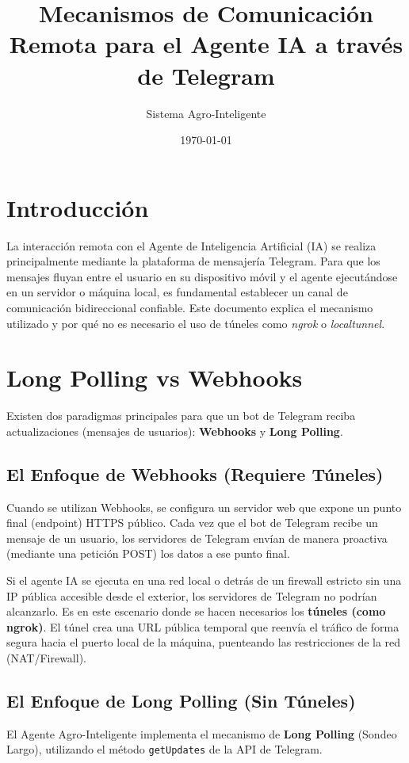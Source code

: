 \documentclass[12pt,a4paper]{article}
\title{Mecanismos de Comunicación Remota para el Agente IA a través de Telegram}
\author{Sistema Agro-Inteligente}
\date{\today}
\begin{document}
\maketitle

\section{Introducción}
La interacción remota con el Agente de Inteligencia Artificial (IA) se realiza principalmente mediante la plataforma de mensajería Telegram. Para que los mensajes fluyan entre el usuario en su dispositivo móvil y el agente ejecutándose en un servidor o máquina local, es fundamental establecer un canal de comunicación bidireccional confiable. Este documento explica el mecanismo utilizado y por qué no es necesario el uso de túneles como \textit{ngrok} o \textit{localtunnel}.

\section{Long Polling vs Webhooks}
Existen dos paradigmas principales para que un bot de Telegram reciba actualizaciones (mensajes de usuarios): \textbf{Webhooks} y \textbf{Long Polling}.

\subsection{El Enfoque de Webhooks (Requiere Túneles)}
Cuando se utilizan Webhooks, se configura un servidor web que expone un punto final (endpoint) HTTPS público. Cada vez que el bot de Telegram recibe un mensaje de un usuario, los servidores de Telegram envían de manera proactiva (mediante una petición POST) los datos a ese punto final.

Si el agente IA se ejecuta en una red local o detrás de un firewall estricto sin una IP pública accesible desde el exterior, los servidores de Telegram no podrían alcanzarlo. Es en este escenario donde se hacen necesarios los \textbf{túneles (como ngrok)}. El túnel crea una URL pública temporal que reenvía el tráfico de forma segura hacia el puerto local de la máquina, puenteando las restricciones de la red (NAT/Firewall).

\subsection{El Enfoque de Long Polling (Sin Túneles)}
El Agente Agro-Inteligente implementa el mecanismo de \textbf{Long Polling} (Sondeo Largo), utilizando el método \texttt{getUpdates} de la API de Telegram. 
\end{document}
